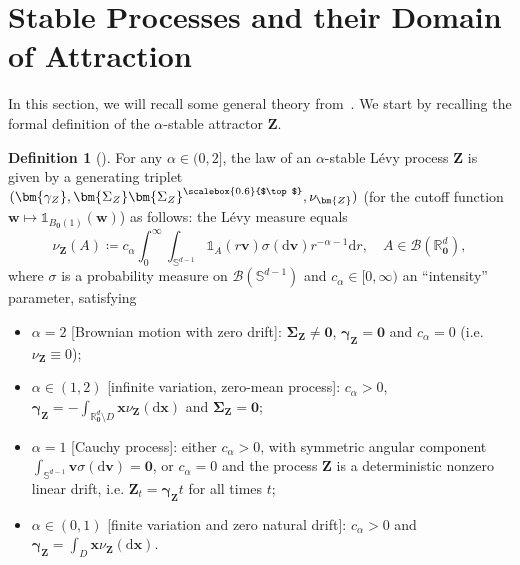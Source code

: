 \documentclass[en,oneside,bbfont,article]{amsart}
\theoremstyle{remark}
\theoremstyle{definition}
\theoremstyle{definition}
\newtheorem{defin}[theorem]{Definition}
\newcommand\Sp{\mathbb{S}}
\newcommand\R{\mathbb{R}}
\newcommand\1{\mathds{1}}
\newcommand{\D}{\mathrm{d}}
\newcommand{\tra}{{\scalebox{0.6}{$\top$}}}
\begin{document}
\appendix
\section{Stable Processes and their Domain of Attraction}

In this section, we will recall some general theory from~\cite{WassersteinPaper}. We start by recalling the formal definition of the $\alpha$-stable attractor $\bm{Z}$. 
\begin{defin}[{\cite[Defn~4.1]{WassersteinPaper}}]\label{def:alpha_stable}
For  any $\alpha\in(0,2]$, the law of 
an $\alpha$-stable 
 L\'evy process $\bm{Z}$
 is given by a generating triplet $(\bm{\gamma_Z},\bm{\Sigma_Z}\bm{\Sigma_Z}^\tra,\nu_{\bm{Z}})$
(for the cutoff function $\bm{w}\mapsto\1_{B_{\bm{0}}(1)}(\bm{w})$)
as follows:  the L\'evy measure equals
\begin{equation}
    \label{eq:Levy-measure-stable}
    \nu_{\bm{Z}}(A)
    \coloneqq c_\alpha\int_0^\infty\int_{\Sp^{d-1}}
        \1_{A}(r\bm{v})\sigma(\D\bm{v})r^{-\alpha-1}\D r,
    \quad A\in\mathcal{B}(\R^d_{\bm{0}}),
\end{equation}
where $\sigma$ is a probability measure  on $\mathcal{B}(\Sp^{d-1})$  
and  $c_\alpha\in[0,\infty)$ an ``intensity'' parameter, satisfying
\begin{itemize}[leftmargin=1em, nosep]
    \item $\alpha=2$ [Brownian motion with zero drift]: $\bm{\Sigma_Z}\ne \bm{0}$, $\bm{\gamma_Z}=\bm{0}$ and $c_\alpha=0$ (i.e. $\nu_{\bm{Z}}\equiv 0$);
    \item $\alpha\in(1,2)$ [infinite variation,  zero-mean process]: $c_\alpha>0$, $\bm{\gamma_Z}=-\int_{\R^d_{\bm0}\setminus D}\bm{x}\nu_{\bm{Z}}(\D\bm{x})$ and $\bm{\Sigma_Z}=\bm{0}$;
    \item $\alpha=1$ [Cauchy process]: either $c_\alpha>0$, with symmetric angular component $\int_{\Sp^{d-1}}\bm{v}\sigma(\D\bm{v})=\bm{0}$, or $c_\alpha=0$ and the process $\bm{Z}$ is  a deterministic nonzero linear drift, i.e. $\bm{Z}_t=\bm{\gamma_Z}t$ for all times $t$;
    \item $\alpha\in(0,1)$ [finite variation and zero natural drift]:  $c_\alpha>0$ and  
    $\bm{\gamma_Z}=\int_{D}\bm{x}\nu_{\bm{Z}}(\D\bm{x})$.
\end{itemize}
\end{defin}
\end{document}
